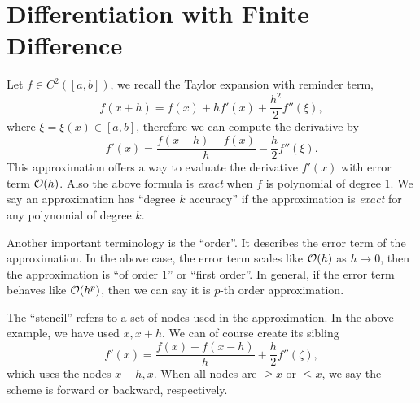 \section{Differentiation with Finite Difference}
Let $f\in C^2([a, b])$, we recall the Taylor expansion with reminder term, 
\begin{equation}
    f(x + h) = f(x) + h f'(x) + \frac{h^2}{2} f''(\xi),
\end{equation}
where $\xi = \xi(x)\in [a, b]$, therefore we can compute the derivative by 
\begin{equation}
    f'(x)  = \frac{f(x + h) - f(x)}{h} - \frac{h}{2} f''(\xi).
\end{equation}
This approximation offers a way to evaluate the derivative $f'(x)$ with error term $\mathcal O(h)$. Also the above formula is \emph{exact} when $f$ is polynomial of degree $1$. We say an approximation has ``degree $k$ accuracy'' if the approximation is \emph{exact} for any polynomial of degree $k$. 

Another important terminology is the ``order''. It describes the error term of the approximation. In the above case, the error term scales like $\mathcal O(h)$ as $h\to 0$, then the approximation is ``of order $1$'' or ``first order''. In general, if the error term behaves like $\mathcal O(h^p)$, then we can say it is $p$-th order approximation. 

The ``stencil'' refers to a set of nodes used in the approximation. In the above example, we have used $x, x+h$. We can of course create its sibling
\begin{equation}
    f'(x) = \frac{f(x) - f(x - h)}{h} + \frac{h}{2} f''(\zeta),
\end{equation}
which uses the nodes $x-h, x$. When all nodes are $\ge x$ or $\le x$, we say the scheme is forward or backward, respectively.

